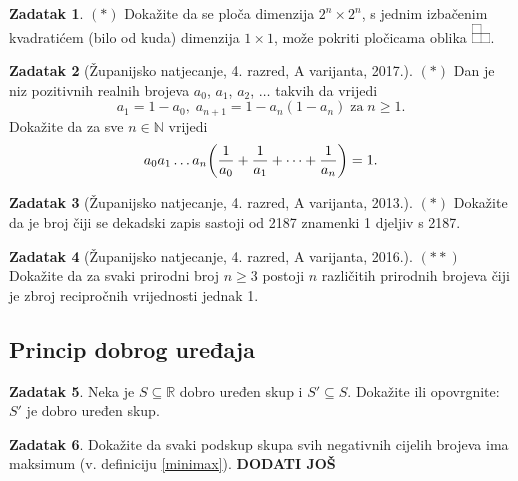 \documentclass{book}
\let\originalleft\left
\let\originalright\right
\renewcommand{\left}{\mathopen{}\mathclose\bgroup\originalleft}
\renewcommand{\right}{\aftergroup\egroup\originalright}
\theoremstyle{definition}
\theoremstyle{definition}
\newtheorem{exercise}{Zadatak}
\theoremstyle{remark}
\begin{document}
\begin{exercise} $(*)$
Dokažite da se ploča dimenzija $2^n\times 2^n$, s jednim izbačenim kvadratićem (bilo od kuda) dimenzija $1\times 1$, može pokriti pločicama oblika \includegraphics[width=0.5cm]{00000.png}.
\end{exercise}
\begin{exercise}[Županijsko natjecanje, 4. razred, A varijanta, 2017.] $(*)$
Dan je niz pozitivnih realnih brojeva $a_0$, $a_1$, $a_2$, $\dots$ takvih da vrijedi
$$a_1=1-a_0,\; a_{n+1}=1-a_n(1-a_n) \; \mathrm{za} \; n\geq 1.$$
Dokažite da za sve $n\in \mathbb{N}$ vrijedi
$$a_0a_1\dots a_n\left(\dfrac{1}{a_0}+\dfrac{1}{a_1}+\dots+ \dfrac{1}{a_n}\right)=1.$$
\end{exercise}
\begin{exercise}[Županijsko natjecanje, 4. razred, A varijanta, 2013.] $(*)$
Dokažite da je broj čiji se dekadski zapis sastoji od 2187 znamenki 1 djeljiv s 2187.
\end{exercise}
\begin{exercise}[Županijsko natjecanje, 4. razred, A varijanta, 2016.] $(**)$
Dokažite da za svaki prirodni broj $n\geq 3$ postoji $n$ različitih prirodnih brojeva čiji je zbroj recipročnih vrijednosti jednak 1.
\end{exercise}

\subsection*{Princip dobrog uređaja}
\begin{exercise}
Neka je $S\subseteq \mathbb{R}$ dobro uređen skup i $S'\subseteq S$. Dokažite ili opovrgnite: $S'$ je dobro uređen skup.
\end{exercise}
\begin{exercise}
Dokažite da svaki podskup skupa svih negativnih cijelih brojeva ima maksimum (v. definiciju \ref{minimax}).
\textbf{DODATI JOŠ}
\end{exercise}
\end{document}

